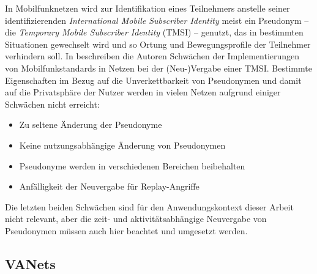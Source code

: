 In Mobilfunknetzen wird zur Identifikation eines Teilnehmers anstelle seiner identifizierenden \textit{International Mobile Subscriber Identity} meist ein Pseudonym -- die \textit{Temporary Mobile Subscriber Identity} (TMSI) -- genutzt, das in bestimmten Situationen gewechselt wird und so Ortung und Bewegungsprofile der Teilnehmer verhindern soll.
In \cite{arapinis2014} beschreiben die Autoren Schwächen der Implementierungen von Mobilfunkstandards in Netzen bei der (Neu-)Vergabe einer TMSI. Bestimmte Eigenschaften im Bezug auf die Unverkettbarkeit von Pseudonymen und damit auf die Privatsphäre der Nutzer werden in vielen Netzen aufgrund einiger Schwächen nicht erreicht:
\begin{itemize}
  \item Zu seltene Änderung der Pseudonyme
  \item Keine nutzungsabhängige Änderung von Pseudonymen
  \item Pseudonyme werden in verschiedenen Bereichen beibehalten
  \item Anfälligkeit der Neuvergabe für Replay-Angriffe
\end{itemize}
Die letzten beiden Schwächen sind für den Anwendungskontext dieser Arbeit nicht relevant, aber die zeit- und aktivitätsabhängige Neuvergabe von Pseudonymen müssen auch hier beachtet und umgesetzt werden.

\subsection{VANets}

